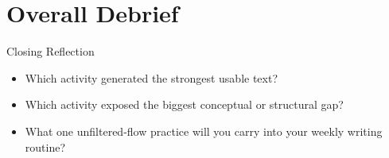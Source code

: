 \documentclass{beamer}
\begin{document}
\section{Overall Debrief}
\begin{frame}{Closing Reflection}
\begin{itemize}
    \item Which activity generated the strongest usable text?
    \item Which activity exposed the biggest conceptual or structural gap?
    \item What one unfiltered-flow practice will you carry into your weekly writing routine?
\end{itemize}
\end{frame}
\end{document}
